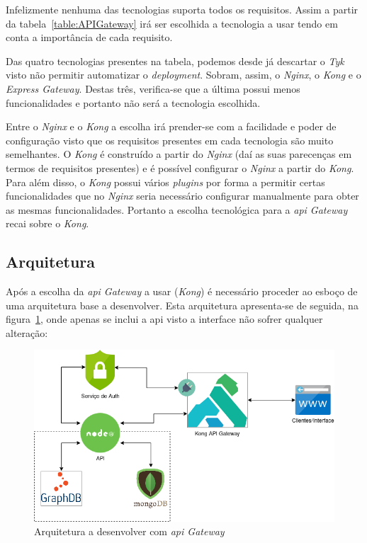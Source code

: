 Infelizmente nenhuma das tecnologias suporta todos os requisitos. 
Assim a partir da tabela~\ref{table:APIGateway} irá ser escolhida a tecnologia a usar tendo em conta a importância 
de cada requisito.

Das quatro tecnologias presentes na tabela, podemos desde já descartar o \textit{Tyk} visto não permitir 
automatizar o \textit{deployment}. Sobram, assim, o \textit{Nginx}, o \textit{Kong} e o \textit{Express Gateway}. 
Destas três, verifica-se que a última possui menos funcionalidades e portanto não será a tecnologia escolhida.

Entre o \textit{Nginx} e o \textit{Kong} a escolha irá prender-se com a facilidade e poder de configuração visto 
que os requisitos presentes em cada tecnologia são muito semelhantes. O \textit{Kong} é construído a partir do 
\textit{Nginx} (daí as suas parecenças em termos de requisitos presentes) e é possível configurar o 
\textit{Nginx} a partir do \textit{Kong}. Para além disso, o \textit{Kong} possui vários \textit{plugins} por 
forma a permitir certas funcionalidades que no \textit{Nginx} seria necessário configurar manualmente para 
obter as mesmas funcionalidades. Portanto a escolha tecnológica para a \textit{\acrshort{api} Gateway} recai 
sobre o \textit{Kong}.

\subsection{Arquitetura}

Após a escolha da \textit{\acrshort{api} Gateway} a usar (\textit{Kong}) é necessário proceder ao esboço de 
uma arquitetura base a desenvolver. Esta arquitetura apresenta-se de seguida, na figura~\ref{fig:apiGatewayArch}, onde apenas se inclui a 
\acrshort{api} visto a interface não sofrer qualquer alteração:
\begin{figure}[H]
    \centering
    \includegraphics[width=1\textwidth]{img/apiGatewayArch.png}
    \caption{Arquitetura a desenvolver com \textit{\acrshort{api} Gateway}}\label{fig:apiGatewayArch}
\end{figure}

